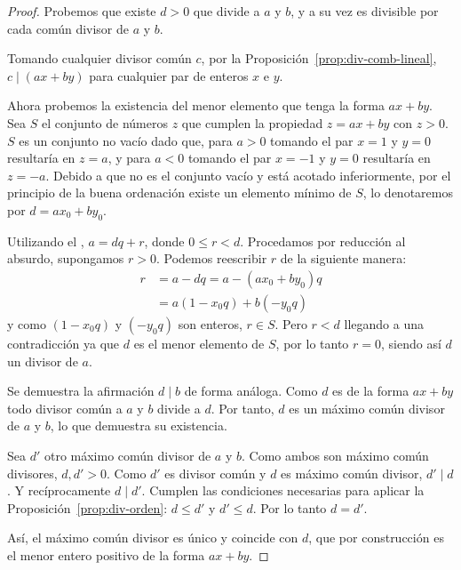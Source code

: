 \begin{proof}
    Probemos que existe $d > 0$ que divide a $a$ y $b$, y
    a su vez es divisible por cada común divisor de $a$ y $b$.

    Tomando cualquier divisor común $c$,
    por la Proposición~\ref{prop:div-comb-lineal}, $c \mid (ax + by)$
    para cualquier par de enteros $x$ e $y$.

    Ahora probemos la existencia del menor elemento que tenga la forma $ax + by$.
    Sea $S$ el conjunto de números $z$ que cumplen la propiedad $z = ax + by$ con $z > 0$.
    $S$ es un conjunto no vacío dado que, para $a > 0$ tomando el par $x = 1$ y $y = 0$
    resultaría en $z = a$, y para $a < 0$ tomando el par $x = -1$ y $y = 0$ resultaría en $z = -a$.
    Debido a que no es el conjunto vacío y está acotado inferiormente, por el principio
    de la buena ordenación existe un elemento mínimo de $S$, lo denotaremos por $d = ax_0 + by_0$.

    Utilizando el , $a = dq + r$, donde $0 \le r < d$.
    Procedamos por reducción al absurdo, supongamos $r > 0$.
    Podemos reescribir $r$ de la siguiente manera:
    \begin{align*}
        r &= a - dq = a - (ax_0 + by_0)q \\
          &= a(1 - x_0q) + b(-y_0q)
    \end{align*}
    y como $(1 - x_0q)$ y $(-y_0q)$ son enteros, $r \in S$. Pero $r < d$ llegando a una contradicción
    ya que $d$ es el menor elemento de $S$, por lo tanto $r = 0$, siendo así $d$ un divisor de $a$.

    Se demuestra la afirmación $d \mid b$ de forma análoga.
    Como $d$ es de la forma $ax + by$ todo divisor común a $a$ y $b$ divide a $d$.
    Por tanto, $d$ es un máximo común divisor de $a$ y $b$, lo que demuestra su existencia.

    Sea $d'$ otro máximo común divisor de $a$ y $b$.
    Como ambos son máximo común divisores, $d, d' > 0$.
    Como $d'$ es divisor común y $d$ es máximo común divisor, $d' \mid d$.
    Y recíprocamente $d \mid d'$.
    Cumplen las condiciones necesarias para aplicar la Proposición~\ref{prop:div-orden}: $d \le d'$ y $d' \le d$.
    Por lo tanto $d = d'$.

    Así, el máximo común divisor es único y coincide con $d$,
    que por construcción es el menor entero positivo de la forma $ax + by$.
\end{proof}





